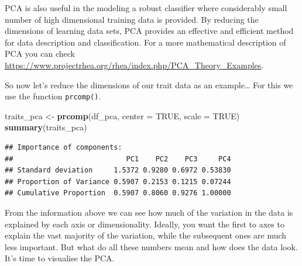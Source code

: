 \documentclass[
]{book}
\newenvironment{Shaded}{\begin{snugshade}}{\end{snugshade}}
\newcommand{\DataTypeTok}[1]{\textcolor[rgb]{0.13,0.29,0.53}{#1}}
\newcommand{\DecValTok}[1]{\textcolor[rgb]{0.00,0.00,0.81}{#1}}
\newcommand{\KeywordTok}[1]{\textcolor[rgb]{0.13,0.29,0.53}{\textbf{#1}}}
\newcommand{\NormalTok}[1]{#1}
\newcommand{\OperatorTok}[1]{\textcolor[rgb]{0.81,0.36,0.00}{\textbf{#1}}}
\newcommand{\OtherTok}[1]{\textcolor[rgb]{0.56,0.35,0.01}{#1}}
\newcommand{\StringTok}[1]{\textcolor[rgb]{0.31,0.60,0.02}{#1}}
\begin{document}
PCA is also useful in the modeling a robust classifier where considerably small number of high dimensional training data is provided. By reducing the dimensions of learning data sets, PCA provides an effective and efficient method for data description and classification.
For a more mathematical description of PCA you can check \url{https://www.projectrhea.org/rhea/index.php/PCA_Theory_Examples}.

So now let's reduce the dimensions of our trait data as an example\ldots{} For this we use the function \texttt{prcomp()}.

\begin{Shaded}
\begin{Highlighting}[]
\NormalTok{traits_pca <-}\StringTok{ }\KeywordTok{prcomp}\NormalTok{(df_pca, }\DataTypeTok{center =} \OtherTok{TRUE}\NormalTok{, }\DataTypeTok{scale =} \OtherTok{TRUE}\NormalTok{)}
\KeywordTok{summary}\NormalTok{(traits_pca)}
\end{Highlighting}
\end{Shaded}

\begin{verbatim}
## Importance of components:
##                           PC1    PC2    PC3     PC4
## Standard deviation     1.5372 0.9280 0.6972 0.53830
## Proportion of Variance 0.5907 0.2153 0.1215 0.07244
## Cumulative Proportion  0.5907 0.8060 0.9276 1.00000
\end{verbatim}

From the information above we can see how much of the variation in the data is explained by each axis or dimensionality. Ideally, you want the first to axes to explain the vast majority of the variation, while the subsequent ones are much less important.
But what do all these numbers mean and how does the data look. It's time to visualise the PCA.

\begin{Shaded}
\end{Shaded}
\end{document}
